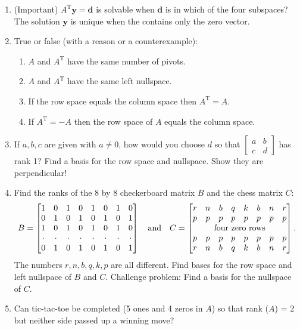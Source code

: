 \documentclass[14pt, a4paper]{article}
\begin{document}
\begin{enumerate}
    \item (Important) $A^{\mathrm{T}}\boldsymbol{y} = \boldsymbol{d}$ is solvable when $\boldsymbol{d}$ is in which of the four subspaces? The solution $\boldsymbol{y}$ is unique when the \underline{\hspace{1.5cm}} contains only the zero vector.

    \item True or false (with a reason or a counterexample):
          \begin{enumerate}
              \item $A$ and $A^{\mathrm{T}}$ have the same number of pivots.
              \item $A$ and $A^{\mathrm{T}}$ have the same left nullspace.
              \item If the row space equals the column space then $A^{\mathrm{T}} = A$.
              \item If $A^{\mathrm{T}} = -A$ then the row space of $A$ equals the column space.
          \end{enumerate}

    \item If $a, b, c$ are given with $a \neq 0$, how would you choose $d$ so that $\begin{bmatrix} a & b \\ c & d \end{bmatrix}$ has rank 1? Find a basis for the row space and nullspace. Show they are perpendicular!

    \item Find the ranks of the 8 by 8 checkerboard matrix $B$ and the chess matrix $C$:
          \[
              B = \begin{bmatrix} 1 & 0 & 1 & 0 & 1 & 0 & 1 & 0 \\ 0 & 1 & 0 & 1 & 0 & 1 & 0 & 1 \\ 1 & 0 & 1 & 0 & 1 & 0 & 1 & 0 \\ \cdot & \cdot & \cdot & \cdot & \cdot & \cdot & \cdot & \cdot \\ 0 & 1 & 0 & 1 & 0 & 1 & 0 & 1 \end{bmatrix} \quad \text{and} \quad
              C = \begin{bmatrix} r & n & b & q & k & b & n & r \\ p & p & p & p & p & p & p & p \\ \multicolumn{8}{c}{\text{four zero rows}} \\ p & p & p & p & p & p & p & p \\ r & n & b & q & k & b & n & r \end{bmatrix}.
          \]
          The numbers $r, n, b, q, k, p$ are all different. Find bases for the row space and left nullspace of $B$ and $C$. Challenge problem: Find a basis for the nullspace of $C$.

    \item Can tic-tac-toe be completed (5 ones and 4 zeros in $A$) so that rank ($A$) = 2 but neither side passed up a winning move?
\end{enumerate}
\end{document}
